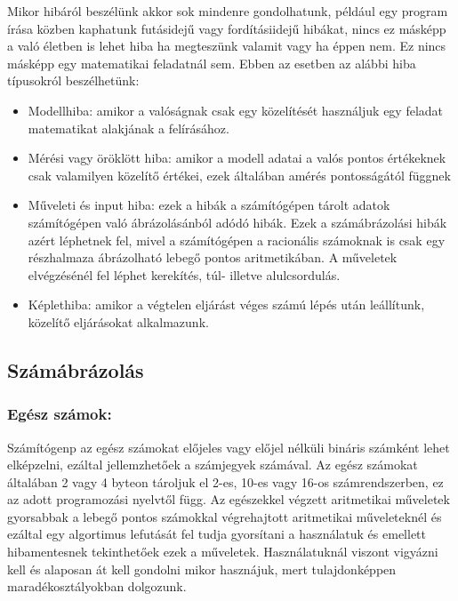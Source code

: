     Mikor hibáról beszélünk akkor sok mindenre gondolhatunk, például egy
program írása közben kaphatunk futásidejű vagy fordításiidejű hibákat,
nincs ez másképp a való életben is lehet hiba ha megteszünk valamit vagy
ha éppen nem. Ez nincs másképp egy matematikai feladatnál sem. Ebben az
esetben az alábbi hiba típusokról beszélhetünk:

\begin{itemize}
\item
  Modellhiba: amikor a valóságnak csak egy közelítését használjuk egy
  feladat matematikat alakjának a felírásához.
\item
  Mérési vagy öröklött hiba: amikor a modell adatai a valós pontos
  értékeknek csak valamilyen közelítő értékei, ezek általában amérés
  pontosságától függnek
\item
  Műveleti és input hiba: ezek a hibák a számítógépen tárolt adatok
  számítógépen való ábrázolásánból adódó hibák. Ezek a számábrázolási
  hibák azért léphetnek fel, mivel a számítógépen a racionális számoknak
  is csak egy részhalmaza ábrázolható lebegő pontos aritmetikában. A
  műveletek elvégzésénél fel léphet kerekítés, túl- illetve
  alulcsordulás.
\item
  Képlethiba: amikor a végtelen eljárást véges számú lépés után
  leállítunk, közelítő eljárásokat alkalmazunk.
\end{itemize}

    \subsection{Számábrázolás}\label{szuxe1muxe1bruxe1zoluxe1s}

    \subsubsection{Egész számok:}\label{eguxe9sz-szuxe1mok}

Számítógenp az egész számokat előjeles vagy előjel nélküli bináris
számként lehet elképzelni, ezáltal jellemzhetőek a számjegyek számával.
Az egész számokat általában 2 vagy 4 byteon tároljuk el 2-es, 10-es vagy
16-os számrendszerben, ez az adott programozási nyelvtől függ. Az
egészekkel végzett aritmetikai műveletek gyorsabbak a lebegő pontos
számokkal végrehajtott aritmetikai műveleteknél és ezáltal egy
algortimus lefutását fel tudja gyorsítani a használatuk és emellett
hibamentesnek tekinthetőek ezek a műveletek. Használatuknál viszont
vigyázni kell és alaposan át kell gondolni mikor hasznájuk, mert
tulajdonképpen maradékosztályokban dolgozunk.

